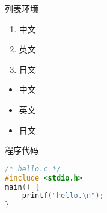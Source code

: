 \documentclass[UTF8,a4paper,12pt]{article}
\begin{document}
列表环境

\begin{enumerate}
  \item 中文
  \item 英文
  \item 日文
\end{enumerate}

\begin{itemize}
  \item 中文
  \item 英文
  \item 日文
\end{itemize}


程序代码

\lstset{columns=flexible,numbers=left,numberstyle=\footnotesize}
\begin{lstlisting}[language=C]
/* hello.c */
#include <stdio.h>
main() {
    printf("hello.\n");
}
\end{lstlisting}
\end{document}
